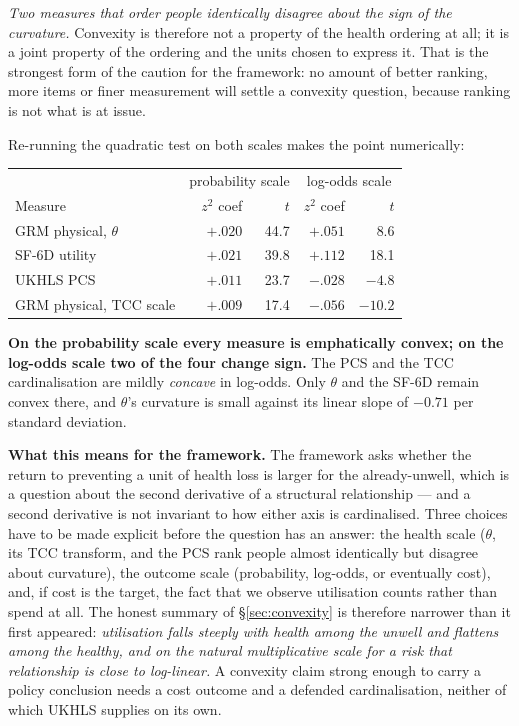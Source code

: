 \documentclass[11pt]{article}
\begin{document}
\emph{Two measures that order people identically disagree about the sign of
the curvature.} Convexity is therefore not a property of the health ordering
at all; it is a joint property of the ordering and the units chosen to
express it. That is the strongest form of the caution for the framework: no
amount of better ranking, more items or finer measurement will settle a
convexity question, because ranking is not what is at issue.

Re-running the quadratic test on both scales makes the point numerically:

\begin{center}\small
\begin{tabular}{lrrrr}
\toprule
 & \multicolumn{2}{c}{probability scale} & \multicolumn{2}{c}{log-odds scale} \\
Measure & $z^2$ coef & $t$ & $z^2$ coef & $t$ \\
\midrule
GRM physical, $\theta$ & $+.020$ & 44.7 & $+.051$ & 8.6 \\
SF-6D utility & $+.021$ & 39.8 & $+.112$ & 18.1 \\
UKHLS PCS & $+.011$ & 23.7 & $\mathbf{-.028}$ & $-4.8$ \\
GRM physical, TCC scale & $+.009$ & 17.4 & $\mathbf{-.056}$ & $-10.2$ \\
\bottomrule
\end{tabular}
\end{center}

\textbf{On the probability scale every measure is emphatically convex; on the
log-odds scale two of the four change sign.} The PCS and the TCC
cardinalisation are mildly \emph{concave} in log-odds. Only $\theta$ and the
SF-6D remain convex there, and $\theta$'s curvature is small against its
linear slope of $-0.71$ per standard deviation.

\textbf{What this means for the framework.} The framework asks whether the
return to preventing a unit of health loss is larger for the already-unwell,
which is a question about the second derivative of a structural relationship
--- and a second derivative is not invariant to how either axis is
cardinalised. Three choices have to be made explicit before the question has
an answer: the health scale ($\theta$, its TCC transform, and the PCS rank
people almost identically but disagree about curvature), the outcome scale
(probability, log-odds, or eventually cost), and, if cost is the target, the
fact that we observe utilisation counts rather than spend at all. The honest
summary of \S\ref{sec:convexity} is therefore narrower than it first
appeared: \emph{utilisation falls steeply with health among the unwell and
flattens among the healthy, and on the natural multiplicative scale for a
risk that relationship is close to log-linear.} A convexity claim strong
enough to carry a policy conclusion needs a cost outcome and a defended
cardinalisation, neither of which UKHLS supplies on its own.
\end{document}
